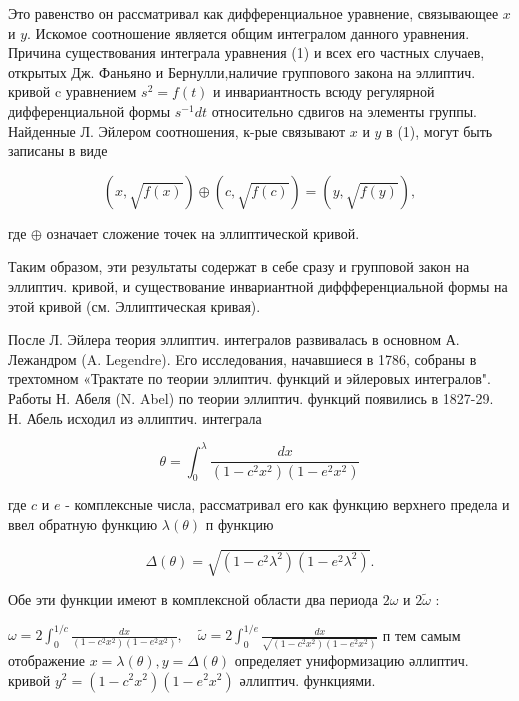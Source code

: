 \documentclass[10pt]{article}
\begin{document}
Это равенство он рассматривал как дифференциальное уравнение, связывающее $x$ и $y$. Искомое соотношение является общим интегралом данного уравнения. Причина существования интеграла уравнения (1) и всех его частных случаев, открытых Дж. Фаньяно и Бернулли,наличие группового закона на эллиптич. кривой $\mathrm{c}$ уравнением $s^{2}=f(t)$ и инвариантность всюду регулярной дифференциальной формы $s^{-1} d t$ относительно сдвигов на элементы группы. Найденные Л. Эйлером соотношения, к-рые связывают $x$ и $y$ в (1), могут быть записаны в виде



\[

(x, \sqrt{f(x)}) \oplus(c, \sqrt{f(c)})=(y, \sqrt{f(y)}),

\]



где $\oplus$ означает сложение точек на эллиптической кривой.



Таким образом, эти результаты содержат в себе сразу и групповой закон на эллиптич. кривой, и существование инвариантной диффференциальной формы на этой кривой (см. Эллиптическая кривая).



После Л. Эйлера теория эллиптич. интегралов развивалась в основном А. Лежандром (A. Legendre). Eго исследования, начавшиеся в 1786, собраны в трехтомном «Трактате по теории эллиптич. функций и эйлеровых интегралов". Работы Н. Абеля (N. Abel) по теории эллиптич. функций появились в 1827-29. Н. Абель исходил из әллиптич. интеграла



\[

\theta=\int_{0}^{\lambda} \frac{d x}{\left(1-c^{2} x^{2}\right)\left(1-e^{2} x^{2}\right)}

\]



где $c$ и $e$ - комплексные числа, рассматривал его как функцию верхнего предела и ввел обратную функцию $\lambda(\theta)$ п функцию



\[

\Delta(\theta)=\sqrt{\left(1-c^{2} \lambda^{2}\right)\left(1-e^{2} \lambda^{2}\right)} .

\]



Обе эти функции имеют в комплексной области два периода $2 \omega$ и $2 \tilde{\omega}$ :



$\omega=2 \int_{0}^{1 / c} \frac{d x}{\left(1-c^{2} x^{2}\right)\left(1-e^{2} x^{2}\right)}, \quad \tilde{\omega}=2 \int_{0}^{1 / e} \frac{d x}{\sqrt{\left(1-c^{2} x^{2}\right)\left(1-e^{2} x^{2}\right)}}$ п тем самым отображение $x=\lambda(\theta), y=\Delta(\theta)$ определяет униформизацию әллиптич. кривой $y^{2}=\left(1-c^{2} x^{2}\right)\left(1-e^{2} x^{2}\right)$ әллиптич. функциями.
\end{document}

